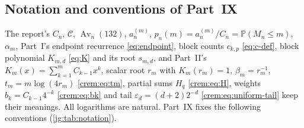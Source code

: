 \documentclass[11pt,a4paper]{article}
\theoremstyle{definition}\newaliascnt{definition}{theorem}
\theoremstyle{remark}\newaliascnt{remark}{theorem}
\newcommand{\Av}{\operatorname{Av}}
\newcommand{\Cat}{\mathcal C}
\newcommand{\eps}{\varepsilon}
\newcommand{\ljP}{\mathbb P}
\begin{document}
\subsection{Notation and conventions of Part~IX}
\label{jg:sec:notation}
The report's $C_n$, $\Cat$, $\Av_n(132)$, $a_n^{(m)}$,
$p_n(m)=a_n^{(m)}/C_n=\ljP(M_n\le m)$, $\alpha_m$, Part~I's endpoint
recurrence \eqref{eq:endpoint}, block counts $c_{k,p}$ \eqref{eq:c-def}, block
polynomial $K_{m,d}$ \eqref{eq:K} and its root $s_{m,d}$, and Part~II's
$K_m(x)=\sum_{k=1}^mC_{k-1}x^k$, scalar root $r_m$ with $K_m(r_m)=1$,
$\beta_m=r_m^{-1}$, $t_m=m\log(4r_m)$ \eqref{crem:eq:tm}, partial sums $H_q$
\eqref{crem:eq:H}, weights $b_k=C_{k-1}4^{-k}$ \eqref{crem:eq:bk} and tail
$\eps_d=(d+2)2^{-d}$ \eqref{crem:eq:uniform-tail} keep their meanings. All
logarithms are natural. Part~IX fixes the following conventions
(\cref{jg:tab:notation}).
\end{document}
